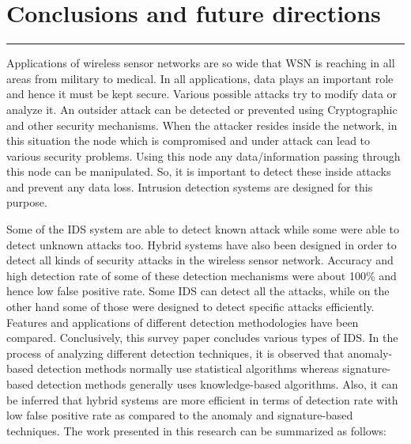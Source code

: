 \chapter{Conclusions and future directions}
\label{C7} %
\noindent\rule{\linewidth}{2pt}
Applications of wireless sensor networks are so wide that WSN is reaching in all areas from military to medical. In all applications, data plays an important role and hence it must be kept secure. Various possible attacks try to modify data or analyze it. An outsider attack can be detected or prevented using Cryptographic and other security mechanisms. When the attacker resides inside the network, in this situation the node which is compromised and under attack can lead to various security problems. Using this node any data/information passing through this node can be manipulated. So, it is important to detect these inside attacks and prevent any data loss. Intrusion detection systems are designed for this purpose.
\par Some of the IDS system are able to detect known attack while some were able to detect unknown attacks too. Hybrid systems have also been designed in order to detect all kinds of security attacks in the wireless sensor network. Accuracy and high detection rate of some of these detection mechanisms were about 100\% and hence low false positive rate. Some IDS can detect all the attacks, while on the other hand some of those were designed to detect specific attacks efficiently. Features and applications of different detection methodologies have been compared. Conclusively, this survey paper concludes various types of IDS. In the process of analyzing different detection techniques, it is observed that anomaly-based detection methods normally use statistical algorithms whereas signature-based detection methods generally uses knowledge-based algorithms. Also, it can be inferred that hybrid systems are more efficient in terms of detection rate with low false positive rate as compared to the anomaly and signature-based techniques. The work presented in this research can be summarized as follows:
